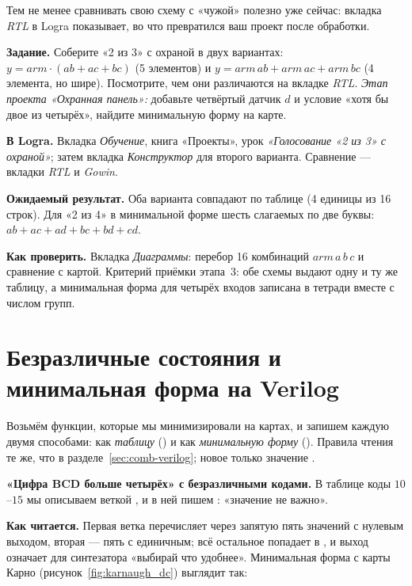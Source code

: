 Тем не менее сравнивать свою схему с «чужой» полезно уже сейчас:
вкладка \emph{RTL} в Logra показывает, во что превратился ваш проект после
обработки.

\begin{diybox}
\textbf{Задание.}  Соберите «2 из 3» с охраной в двух вариантах:
$y=arm\cdot(ab+ac+bc)$ (5 элементов) и $y=arm\,ab+arm\,ac+arm\,bc$
(4 элемента, но шире).  Посмотрите, чем они различаются на
вкладке \emph{RTL}.  \emph{Этап проекта «Охранная панель»:}
добавьте четвёртый датчик $d$ и условие «хотя бы двое из четырёх»,
найдите минимальную форму на карте.

\textbf{В Logra.} Вкладка \emph{Обучение}, книга «Проекты», урок
\emph{«Голосование «2 из 3» с охраной»}; затем вкладка \emph{Конструктор} для
второго варианта. Сравнение --- вкладки \emph{RTL} и \emph{Gowin}.

\textbf{Ожидаемый результат.} Оба варианта совпадают по таблице
(4 единицы из 16 строк). Для «2 из 4» в минимальной форме шесть слагаемых
по две буквы: $ab+ac+ad+bc+bd+cd$.

\textbf{Как проверить.} Вкладка \emph{Диаграммы}: перебор 16 комбинаций
$arm\,a\,b\,c$ и сравнение с картой. Критерий приёмки этапа~3: обе схемы
выдают одну и ту же таблицу, а минимальная форма для четырёх входов
записана в тетради вместе с числом групп.
\end{diybox}

\section{Безразличные состояния и минимальная форма на Verilog}
\label{sec:min-verilog}

Возьмём функции, которые мы минимизировали на картах, и запишем каждую
двумя способами: как \emph{таблицу} () и как \emph{минимальную
форму} (). Правила чтения те же, что в
разделе~\ref{sec:comb-verilog}; новое только значение .

\textbf{«Цифра BCD больше четырёх» с безразличными кодами.}
В таблице коды $10$--$15$ мы описываем веткой , и в ней пишем
: «значение не важно».


\textbf{Как читается.} Первая ветка перечисляет через запятую пять значений
с нулевым выходом, вторая --- пять с единичным; всё остальное попадает
в , и выход  означает для синтезатора «выбирай что
удобнее». Минимальная форма с карты Карно
(рисунок~\ref{fig:karnaugh_dc}) выглядит так:

